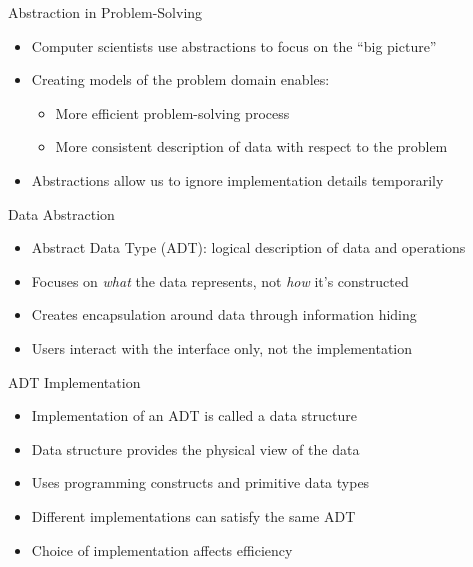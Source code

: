 \begin{frame}{Abstraction in Problem-Solving}
    \begin{itemize}
        \item Computer scientists use abstractions to focus on the ``big picture''
        \item Creating models of the problem domain enables:
        \begin{itemize}
            \item More efficient problem-solving process
            \item More consistent description of data with respect to the problem
        \end{itemize}
        \item Abstractions allow us to ignore implementation details temporarily
    \end{itemize}
\end{frame}

\begin{frame}{Data Abstraction}
    \begin{itemize}
        \item Abstract Data Type (ADT): logical description of data and operations
        \item Focuses on \textit{what} the data represents, not \textit{how} it's constructed
        \item Creates encapsulation around data through information hiding
        \item Users interact with the interface only, not the implementation
    \end{itemize}
\end{frame}

\begin{frame}{ADT Implementation}
    \begin{itemize}
        \item Implementation of an ADT is called a data structure
        \item Data structure provides the physical view of the data
        \item Uses programming constructs and primitive data types
        \item Different implementations can satisfy the same ADT
        \item Choice of implementation affects efficiency
    \end{itemize}
\end{frame}

